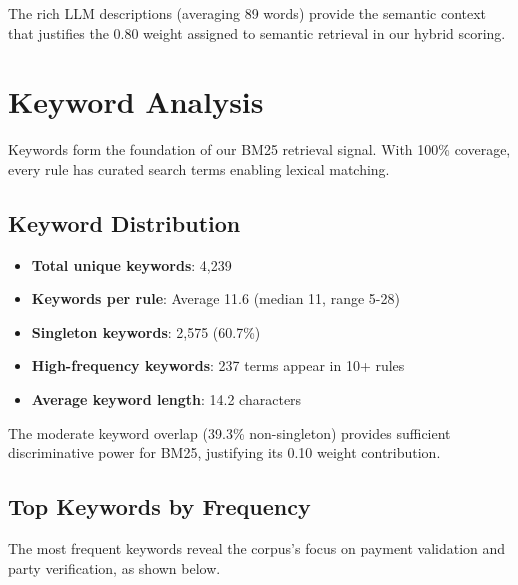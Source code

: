 The rich LLM descriptions (averaging 89 words) provide the semantic context that justifies the 0.80 weight assigned to semantic retrieval in our hybrid scoring.

\section{Keyword Analysis}

Keywords form the foundation of our BM25 retrieval signal. With 100\% coverage, every rule has curated search terms enabling lexical matching.

\subsection{Keyword Distribution}

\begin{itemize}[leftmargin=*,itemsep=2pt,topsep=2pt]
 \item \textbf{Total unique keywords}: 4,239
 \item \textbf{Keywords per rule}: Average 11.6 (median 11, range 5-28)
 \item \textbf{Singleton keywords}: 2,575 (60.7\%)
 \item \textbf{High-frequency keywords}: 237 terms appear in 10+ rules
 \item \textbf{Average keyword length}: 14.2 characters
\end{itemize}

The moderate keyword overlap (39.3\% non-singleton) provides sufficient discriminative power for BM25, justifying its 0.10 weight contribution.

\subsection{Top Keywords by Frequency}

The most frequent keywords reveal the corpus's focus on payment validation and party verification, as shown below.

